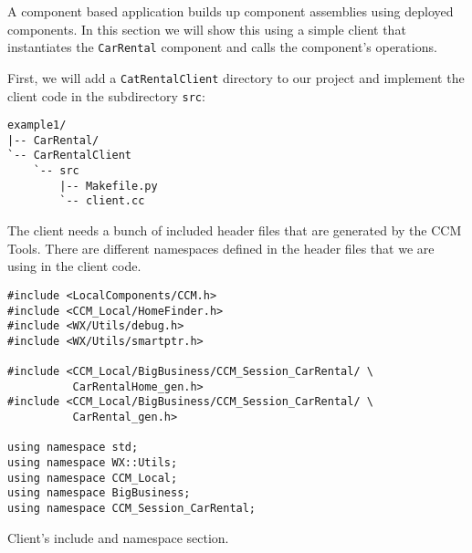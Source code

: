 A component based application builds up component assemblies using deployed 
components. In this section we will show this using a simple client that
instantiates the {\tt CarRental} component and calls the component's operations.

First, we will add a {\tt CatRentalClient} directory to our project and implement
the client code in the subdirectory {\tt src}:
\begin{small}
\begin{verbatim}
example1/
|-- CarRental/
`-- CarRentalClient
    `-- src
        |-- Makefile.py
        `-- client.cc
\end{verbatim}
\end{small}

The client needs a bunch of included header files that are generated by the CCM Tools.
There are different namespaces defined in the header files that we are using in the 
client code.
\begin{Example}
\begin{minifbox}
\begin{small}
\begin{verbatim}
#include <LocalComponents/CCM.h>
#include <CCM_Local/HomeFinder.h>
#include <WX/Utils/debug.h>
#include <WX/Utils/smartptr.h>

#include <CCM_Local/BigBusiness/CCM_Session_CarRental/ \
          CarRentalHome_gen.h>
#include <CCM_Local/BigBusiness/CCM_Session_CarRental/ \
          CarRental_gen.h>

using namespace std;
using namespace WX::Utils;
using namespace CCM_Local;
using namespace BigBusiness;
using namespace CCM_Session_CarRental;
\end{verbatim}
\end{small}
\end{minifbox}
\caption{Client's include and namespace section.}
\label{example:}
\end{Example}

